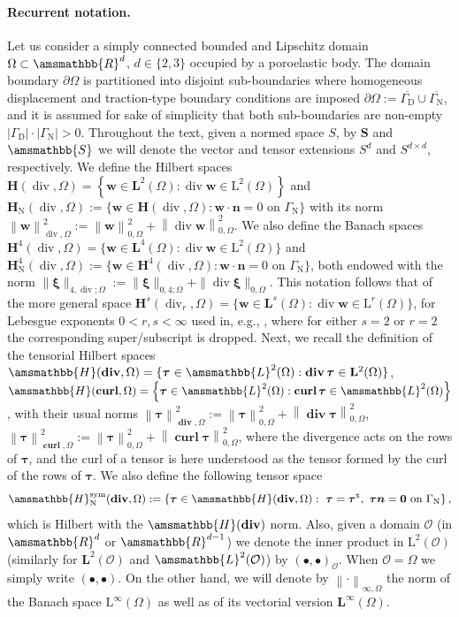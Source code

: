 \documentclass[fleqn,a4paper]{cas-sc}
\newcommand\cero{\boldsymbol{0}}
\newcommand{\norm}[1]{\left\|#1\right\|}
\newcommand\vdiv{\mathop{\mathrm{div}}\nolimits}
\newcommand\bcurl{\mathop{\mathbf{curl}}\nolimits}
\newcommand\bdiv{\mathop{\mathbf{div}}\nolimits}
\newcommand{\bS}{\mathbf{S}}
\newcommand{\bbS}{\amsmathbb{S}}
\newcommand{\bbR}{\amsmathbb{R}}
\newcommand\RR{\bbR}
\newcommand{\bn}{\boldsymbol{n}}
\newcommand{\bw}{\boldsymbol{w}}
\newcommand{\bxi}{\boldsymbol{\xi}}
\newcommand{\0}{\boldsymbol{0}}
\newcommand\bbH{\amsmathbb{H}}
\newcommand\bH{\mathbf{H}}
\newcommand\bL{\mathbf{L}}
\newcommand\rL{\mathrm{L}}
\newcommand\bbL{\amsmathbb{L}}
\newcommand\btau{\boldsymbol{\tau}}
\numberwithin{equation}{section}
\numberwithin{figure}{section}
\begin{document}
\paragraph{Recurrent notation.}
Let us consider a simply connected bounded and Lipschitz domain $\Omega\subset\RR^d$, $d \in \{2,3\}$ occupied by a poroelastic body. 
The domain boundary $\partial\Omega$ is partitioned into disjoint sub-boundaries where homogeneous displacement and traction-type boundary conditions are imposed  $\partial\Omega:= \overline{\Gamma_{\mathrm{D}}} \cup \overline{\Gamma_{\mathrm{N}}}$, and it is assumed for sake of simplicity that both sub-boundaries are non-empty $|\Gamma_{\mathrm{D}}|\cdot|\Gamma_{\mathrm{N}}|>0$. Throughout the text, given a normed space $S$, by $\bS$ and $\bbS$ we will denote the vector and tensor extensions $S^d$ and $S^{d\times d}$, respectively. We define the Hilbert spaces $\bH(\vdiv,\Omega)=\left\{\bw \in \bL^2(\Omega): \vdiv\bw \in \rL^2(\Omega) \right\}$ and $\bH_{\mathrm{N}}(\vdiv,\Omega) := \{\bw\in \bH(\vdiv,\Omega): \bw \cdot \bn = 0 \text{ on } \Gamma_{\mathrm{N}}\}$ with its norm $\norm{\bw}_{\vdiv,\Omega}^2:=\norm{\bw}^2_{0,\Omega}+\norm{\vdiv\bw}^2_{0,\Omega}$. We also define the Banach spaces $\bH^{4}(\vdiv,\Omega)=\{\bw \in \bL^4(\Omega): \vdiv\bw \in \rL^2(\Omega) \}$ and $\bH^{4}_{\mathrm{N}}(\vdiv,\Omega) := \{\bw\in \bH^{4}(\vdiv,\Omega): \bw \cdot \bn = 0 \text{ on } \Gamma_{\mathrm{N}}\}$, both endowed with the norm $\|\bxi\|_{4,\vdiv;\Omega} := \|\bxi\|_{0,4;\Omega} + \|\vdiv\bxi\|_{0,\Omega}$. {This notation follows that of the more general space $\bH^{s}(\vdiv_r,\Omega)=\{\bw \in \bL^s(\Omega): \vdiv\bw \in \rL^r(\Omega) \}$, for Lebesgue exponents $0<r,s<\infty$ used in, e.g., \cite{gatica2021p,cgm-M2AN-2020,caucao2024banach}, where for either $s=2$ or $r=2$ the corresponding super/subscript is dropped.}
Next, we recall the definition of the tensorial Hilbert spaces 
$\bbH(\bdiv,\Omega)=\{\btau \in \bbL^2(\Omega): \bdiv\btau \in \bL^2(\Omega) \}$, $\bbH(\bcurl,\Omega)=\left\{\btau \in \bbL^2(\Omega): \bcurl\btau \in \bbL^2(\Omega) \right\}$, with their usual norms 
$\norm{\btau}_{\bdiv,\Omega}^2:=\norm{\btau}^2_{0,\Omega}+\norm{\bdiv\btau}^2_{0,\Omega}$,   $\norm{\btau}_{\bcurl,\Omega}^2:=\norm{\btau}^2_{0,\Omega}+\norm{\bcurl\btau}^2_{0,\Omega}$,  
where the divergence acts on the rows of $\btau$, and the curl of a tensor is here understood as the tensor formed by the curl of the rows of $\btau$.  
We also define the  following tensor space  
\begin{equation*}%
\bbH^{\mathrm{sym}}_{\mathrm{N}}({\mathbf{div}},\Omega):=\left\{\btau \in
\bbH(\bdiv,\Omega): \ \btau = \btau^{\tt t}, \ \btau\bn=\cero\ \text{on}\ \Gamma_{\mathrm{N}}  \right\},\end{equation*}
which is Hilbert with the $\bbH(\bdiv)$ norm. Also, given a domain $\mathcal{O}$ (in $\bbR^d$ or $\bbR^{d-1}$) we denote the inner product in $\rL^2(\mathcal{O})$ (similarly for $\bL^2(\mathcal{O})$ and $\bbL^2(\mathcal{O})$)  by $(\bullet,\bullet)_{\mathcal{O}}$. When $\mathcal{O}= \Omega$ we simply write $(\bullet,\bullet)$. On the other hand, we will denote by $\norm{\cdot}_{\infty,\Omega}$ the norm of the  Banach space $\mathrm L^\infty(\Omega)$
as well as of its vectorial version $\mathbf L^\infty(\Omega)$.
\end{document}
